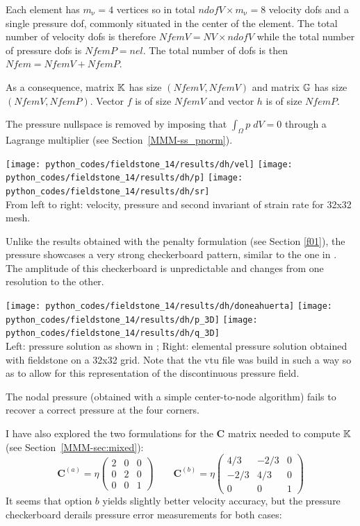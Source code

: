Each element has $m_\upnu=4$ vertices so in total $ndofV\times m_\upnu=8$ 
velocity dofs and a single 
pressure dof, commonly situated in the center of the element. The total number of 
velocity dofs is therefore $NfemV=NV \times ndofV$ while the total number of
pressure dofs is $NfemP=nel$. The total number of dofs is then $Nfem=NfemV+NfemP$.

As a consequence, matrix ${\mathbb{K}}$ has size $(NfemV,NfemV)$ and matrix ${\mathbb{G}}$ has size $(NfemV,NfemP)$.
Vector $f$ is of size $NfemV$ and vector $h$ is of size $NfemP$.  

The pressure nullspace is removed by imposing that $\int_\Omega p \; dV =0$ through 
a Lagrange multiplier (see Section~\ref{MMM-ss_pnorm}).

\begin{center}
\texttt{[image: python\_codes/fieldstone\_14/results/dh/vel]}
\texttt{[image: python\_codes/fieldstone\_14/results/dh/p]}
\texttt{[image: python\_codes/fieldstone\_14/results/dh/sr]}\\
{\captionfont From left to right: velocity, pressure and second invariant 
of strain rate for 32x32 mesh.}
\end{center}

Unlike the results obtained with the penalty formulation (see Section \ref{f01}),
the pressure showcases a very strong checkerboard pattern, similar to the one 
in \cite{dohu03}. The amplitude of this checkerboard is unpredictable 
and changes from one resolution to the other.

\begin{center}
\texttt{[image: python\_codes/fieldstone\_14/results/dh/doneahuerta]}
\texttt{[image: python\_codes/fieldstone\_14/results/dh/p\_3D]}
\texttt{[image: python\_codes/fieldstone\_14/results/dh/q\_3D]}\\
{\captionfont Left: pressure solution as shown in \cite{dohu03}; Right: elemental 
pressure solution obtained with fieldstone on a 32x32 grid. 
Note that the vtu file was build in such a way so as to allow for 
this representation of the discontinuous pressure field.}
\end{center}

The nodal pressure (obtained with a simple center-to-node algorithm)
fails to recover a correct pressure at the four corners.

I have also explored the two formulations for the ${\bm C}$ matrix needed to 
compute ${\mathbb{K}}$ (see Section~\ref{MMM-sec:mixed}):
\[
{\bm C}^{(a)}= \eta 
\left(
\begin{array}{ccc}
2 & 0 & 0 \\
0 & 2 & 0 \\
0 & 0 & 1
\end{array}
\right)
\qquad
{\bm C}^{(b)}= \eta
\left(
\begin{array}{ccc}
4/3 & -2/3 & 0 \\
-2/3 & 4/3 & 0 \\
0 & 0 & 1
\end{array}
\right)
\]
It seems that option $b$ yields slightly better velocity accuracy, but the pressure 
checkerboard derails pressure error measurements for both cases:

